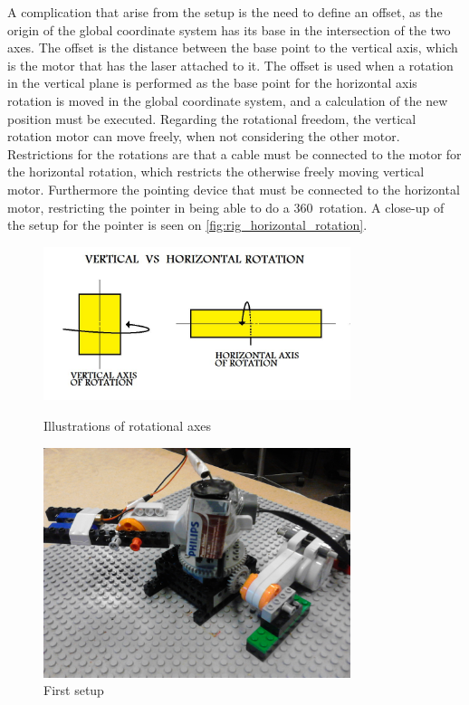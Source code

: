 A complication that arise from the setup is the need to define an offset, as the origin of the global coordinate system has its base in the intersection of the two axes. The offset is the distance between the base point to the vertical axis, which is the motor that has the laser attached to it. The offset is used when a rotation in the vertical plane is performed as the base point for the horizontal axis rotation is moved in the global coordinate system, and a calculation of the new position must be executed. Regarding the rotational freedom, the vertical rotation motor can move freely, when not considering the other motor. Restrictions for the rotations are that a cable must be connected to the motor for the horizontal rotation, which restricts the otherwise freely moving vertical motor. Furthermore the pointing device that must be connected to the horizontal motor, restricting the pointer in being able to do a 360\degree\ rotation. A close-up of the setup for the pointer is seen on \cref{fig:rig_horizontal_rotation}.
\begin{figure}[H]
	\begin{minipage}{0.5\textwidth}
		\centering
    	\includegraphics[width=0.80\textwidth]{graphics/rotation_definitions.jpg}
    	\caption{Illustrations of rotational axes \cite{rotation_definitions}}
    	\label{fig:rotation_defs}
	\end{minipage}
	\begin{minipage}{0.5\textwidth}
		\centering
    	\includegraphics[width=0.80\textwidth]{graphics/rig/rig_flat_entire.jpg}
    	\caption{First setup}
	    \label{fig:rig_flat}
	\end{minipage}
\end{figure}

